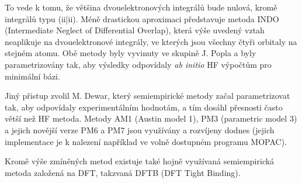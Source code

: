 To vede k tomu, že většina dvouelektronových integrálů bude nulová, kromě integrálů typu (ii|ii). Méně drastickou aproximaci představuje metoda INDO (Intermediate Neglect of Differential Overlap), která výše uvedený vztah neaplikuje na dvouelektronové integrály, ve kterých jsou všechny čtyři orbitaly na stejném atomu.
Obě metody byly vyvinuty ve skupině J. Popla a byly parametrizovány tak, aby výsledky odpovídaly \textit{ab initio} HF výpočtům pro minimální bázi. 
 
Jiný přistup zvolil M. Dewar, který semiempirické metody začal parametrizovat tak, aby odpovídaly experimentálním hodnotám, a tím dosáhl přesnosti často větší než HF metoda. Metody AM1 (Austin model 1), PM3 (parametric model 3) a jejich novější verze PM6 a PM7 jsou využívány a rozvíjeny dodnes (jejich implementace je k nalezení například ve volně dostupném programu MOPAC).

Kromě výše zmíněných metod existuje také hojně využívaná semiempirická metoda založená na DFT, takzvaná DFTB (DFT Tight Binding).


 
